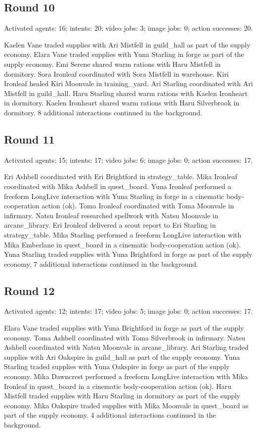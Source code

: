 \documentclass[11pt,a4paper]{article}
\begin{document}
\subsection{Round 10}
Activated agents: 16; intents: 20; video jobs: 3; image jobs: 0; action successes: 20.

Kaelen Vane traded supplies with Ari Mistfell in guild\_hall as part of the supply economy. Elara Vane traded supplies with Yuna Starling in forge as part of the supply economy. Emi Serene shared warm rations with Haru Mistfell in dormitory. Sora Ironleaf coordinated with Sora Mistfell in warehouse. Kiri Ironleaf healed Kiri Moonvale in training\_yard. Ari Starling coordinated with Ari Mistfell in guild\_hall. Haru Starling shared warm rations with Kaelen Ironheart in dormitory. Kaelen Ironheart shared warm rations with Haru Silverbrook in dormitory. 8 additional interactions continued in the background.

\subsection{Round 11}
Activated agents: 15; intents: 17; video jobs: 6; image jobs: 0; action successes: 17.

Eri Ashbell coordinated with Eri Brightford in strategy\_table. Mika Ironleaf coordinated with Mika Ashbell in quest\_board. Yuna Ironleaf performed a freeform LongLive interaction with Yuna Starling in forge in a cinematic body-cooperation action (ok). Toma Ironleaf coordinated with Toma Moonvale in infirmary. Natsu Ironleaf researched spellwork with Natsu Moonvale in arcane\_library. Eri Ironleaf delivered a scout report to Eri Starling in strategy\_table. Mika Starling performed a freeform LongLive interaction with Mika Emberlane in quest\_board in a cinematic body-cooperation action (ok). Yuna Starling traded supplies with Yuna Brightford in forge as part of the supply economy. 7 additional interactions continued in the background.

\subsection{Round 12}
Activated agents: 12; intents: 17; video jobs: 5; image jobs: 0; action successes: 17.

Elara Vane traded supplies with Yuna Brightford in forge as part of the supply economy. Toma Ashbell coordinated with Toma Silverbrook in infirmary. Natsu Ashbell coordinated with Natsu Moonvale in arcane\_library. Ari Starling traded supplies with Ari Oakspire in guild\_hall as part of the supply economy. Yuna Starling traded supplies with Yuna Oakspire in forge as part of the supply economy. Mika Dawncrest performed a freeform LongLive interaction with Mika Ironleaf in quest\_board in a cinematic body-cooperation action (ok). Haru Mistfell traded supplies with Haru Starling in dormitory as part of the supply economy. Mika Oakspire traded supplies with Mika Moonvale in quest\_board as part of the supply economy. 4 additional interactions continued in the background.
\end{document}
